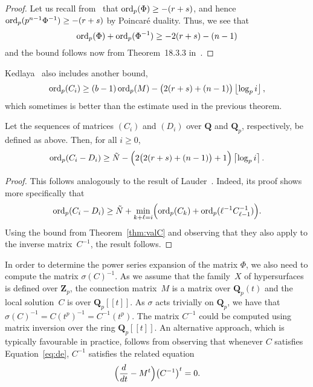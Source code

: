 \begin{proof}
Let us recall from~\citep[Lemma~3.3]{Gerkmann2007} that 
$\operatorname{ord}_p(\Phi) \geq -(r+s)$, and hence $\operatorname{ord}_p(p^{n-1}\Phi^{-1}) \geq -(r+s)$ 
by Poincar\'e duality.  Thus, we see that 
\begin{equation}
\operatorname{ord}_p(\Phi) + \operatorname{ord}_p(\Phi^{-1}) \geq - 2 (r+s) - (n-1)
\end{equation}
and the bound follows now from Theorem~{18.3.3} in~\citep{Kedlaya2010}.
\end{proof}

\begin{rem}
Kedlaya~\citep[Remark~18.3.4]{Kedlaya2010} also includes another bound,
\begin{equation}
\operatorname{ord}_p(C_i) \geq (b - 1) \operatorname{ord}_p(M) - \bigl(2 (r + s) + (n - 1)\bigr) \left\lfloor\log_p i\right\rfloor,
\end{equation}
which sometimes is better than the estimate used in the previous 
theorem.
\end{rem}

\begin{thm}
Let the sequences of matrices $(C_i)$ and $(D_i)$ over $\mathbf{Q}$ and 
$\mathbf{Q}_p$, respectively, be defined as above.  Then, for all $i \geq 0$, 
\begin{equation}
\operatorname{ord}_p(C_i - D_i) \geq 
    \tilde{N} - \Bigl(2 \bigl(2 (r+s) + (n-1)\bigr) + 1\Bigr) \left\lceil\log_p i\right\rceil.
\end{equation}
\end{thm}

\begin{proof}
This follows analogously to the result of 
Lauder~\citep[Theorem~5.1]{Lauder2006}.  
Indeed, its proof shows more specifically that 
\begin{equation}
\operatorname{ord}_p(C_i - D_i) \geq 
    \tilde{N} + \min_{k+\ell=i} \Bigl(\operatorname{ord}_p(C_k) + 
                                      \operatorname{ord}_p(\ell^{-1} C_{\ell-1}^{-1})\Bigr).
\end{equation}
Using the bound from Theorem~\ref{thm:valC} and observing that 
they also apply to the inverse matrix~$C^{-1}$, the result follows.
\end{proof}

In order to determine the power series expansion of the matrix $\Phi$, 
we also need to compute the matrix $\sigma(C)^{-1}$.  As we assume that 
the family~$X$ of hypersurfaces is defined over $\mathbf{Z}_p$, the connection 
matrix~$M$ is a matrix over $\mathbf{Q}_p(t)$ and the local solution~$C$ is 
over $\mathbf{Q}_p[[t]]$.  As $\sigma$ acts trivially on $\mathbf{Q}_p$, 
we have that $\sigma(C)^{-1} = C(t^p)^{-1} = C^{-1}(t^p)$. 
The matrix $C^{-1}$ could be computed using matrix inversion over the ring 
$\mathbf{Q}_p[[t]]$.  An alternative approach, which is typically favourable 
in practice, follows from observing that whenever $C$ satisfies 
Equation~\eqref{eq:de}, $C^{-1}$ satisfies the related equation 
\begin{equation}
\Bigl(\frac{d}{dt} - M^t\Bigr) \bigl(C^{-1}\bigr)^t = 0.
\end{equation}

